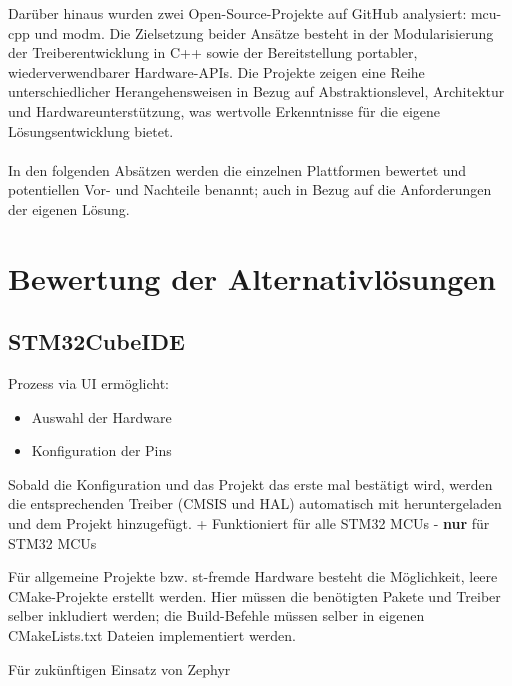 Darüber hinaus wurden zwei Open-Source-Projekte auf GitHub analysiert: mcu-cpp und modm. 
Die Zielsetzung beider Ansätze besteht in der Modularisierung der Treiberentwicklung in C++ sowie der Bereitstellung portabler, wiederverwendbarer Hardware-APIs. 
Die Projekte zeigen eine Reihe unterschiedlicher Herangehensweisen in Bezug auf Abstraktionslevel, Architektur und Hardwareunterstützung, was wertvolle Erkenntnisse für die eigene Lösungsentwicklung bietet.
\\
\\
In den folgenden Absätzen werden die einzelnen Plattformen bewertet und potentiellen Vor- und Nachteile benannt; auch in Bezug auf die Anforderungen der eigenen Lösung. 

\section{Bewertung der Alternativlösungen}
\subsection{STM32CubeIDE}
Prozess via UI ermöglicht:
\begin{itemize}
	\item Auswahl der Hardware
	\item Konfiguration der Pins
\end{itemize}

Sobald die Konfiguration und das Projekt das erste mal bestätigt wird, werden die entsprechenden Treiber (CMSIS und HAL) automatisch mit heruntergeladen und dem Projekt hinzugefügt.
+ Funktioniert für alle STM32 MCUs
- \textbf{nur} für STM32 MCUs

Für allgemeine Projekte bzw. st-fremde Hardware besteht die Möglichkeit, leere CMake-Projekte erstellt werden.
Hier müssen die benötigten Pakete und Treiber selber inkludiert werden; die Build-Befehle müssen selber in eigenen CMakeLists.txt Dateien implementiert werden.

Für zukünftigen Einsatz von Zephyr


